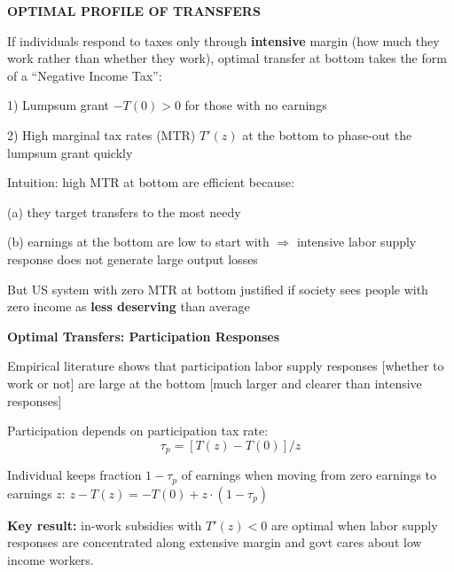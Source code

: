 \documentclass[landscape]{slides}
\begin{document}
\begin{slide}
\begin{center}
{\bf OPTIMAL PROFILE OF TRANSFERS}
\end{center}
If individuals respond to taxes only through \textbf{intensive} margin (how much they work rather than
whether they work), optimal transfer at bottom takes the
form of a ``Negative Income Tax'':

1) Lumpsum grant $-T(0)>0$ for those with no earnings

2) High marginal tax rates (MTR) $T'(z)$ at the bottom to phase-out the lumpsum grant
quickly

Intuition: high MTR at bottom are efficient because:

(a) they target transfers to the most needy

(b) earnings at the bottom are low to start with $\Rightarrow$ intensive
labor supply response does not generate large output losses

But US system with zero MTR at bottom justified if society sees people
with zero income as \textbf{less deserving} than average 
\end{slide}

\begin{slide}

\end{slide}



\begin{slide}
\begin{center}
{\bf Optimal Transfers: Participation Responses}
\end{center}
Empirical literature shows that participation labor supply
responses [whether to work or not] are large at the bottom
[much larger and clearer than intensive responses]

Participation depends on participation tax rate:
\[ \tau_p=[T(z)-T(0)]/z \]

Individual keeps fraction $1-\tau_p$ of
earnings when moving from zero earnings to earnings $z$:
$z-T(z)=-T(0) + z \cdot (1-\tau_p)$

{\bf Key result:} in-work subsidies with $T'(z)<0$
are optimal when labor supply responses are concentrated along
extensive margin and govt cares about low income workers.

\end{slide}

\begin{slide}

\end{slide}
\end{document}
